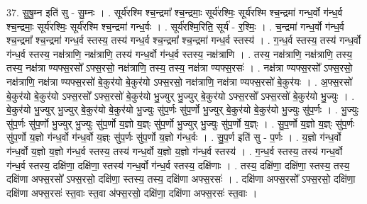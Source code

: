 \documentclass[17pt]{extarticle}
\begin{document}
37. सु॒षु॒म्न इति॑ सु - सु॒म्नः । . सूर्य॑रश्मि श्च॒न्द्रमा᳚ श्च॒न्द्रमाः॒ सूर्य॑रश्मिः॒ सूर्य॑रश्मि श्च॒न्द्रमा॑ गन्ध॒र्वो ग॑न्ध॒र्व श्च॒न्द्रमाः॒ सूर्य॑रश्मिः॒ सूर्य॑रश्मि श्च॒न्द्रमा॑ गन्ध॒र्वः । . सूर्य॑रश्मि॒रिति॒ सूर्य॑ - र॒श्मिः॒ । . च॒न्द्रमा॑ गन्ध॒र्वो ग॑न्ध॒र्व श्च॒न्द्रमा᳚ श्च॒न्द्रमा॑ गन्ध॒र्व स्तस्य॒ तस्य॑ गन्ध॒र्व श्च॒न्द्रमा᳚ श्च॒न्द्रमा॑ गन्ध॒र्व स्तस्य॑ । . ग॒न्ध॒र्व स्तस्य॒ तस्य॑ गन्ध॒र्वो ग॑न्ध॒र्व स्तस्य॒ नक्ष॑त्राणि॒ नक्ष॑त्राणि॒ तस्य॑ गन्ध॒र्वो ग॑न्ध॒र्व स्तस्य॒ नक्ष॑त्राणि । . तस्य॒ नक्ष॑त्राणि॒ नक्ष॑त्राणि॒ तस्य॒ तस्य॒ नक्ष॑त्रा ण्यफ्स॒रसो᳚ ऽफ्स॒रसो॒ नक्ष॑त्राणि॒ तस्य॒ तस्य॒ नक्ष॑त्रा ण्यफ्स॒रसः॑ । . नक्ष॑त्रा ण्यफ्स॒रसो᳚ ऽफ्स॒रसो॒ नक्ष॑त्राणि॒ नक्ष॑त्रा ण्यफ्स॒रसो॑ बे॒कुर॑यो बे॒कुर॑यो ऽफ्स॒रसो॒ नक्ष॑त्राणि॒ नक्ष॑त्रा ण्यफ्स॒रसो॑ बे॒कुर॑यः । . अ॒फ्स॒रसो॑ बे॒कुर॑यो बे॒कुर॑यो ऽफ्स॒रसो᳚ ऽफ्स॒रसो॑ बे॒कुर॑यो भु॒ज्युर् भु॒ज्युर् बे॒कुर॑यो ऽफ्स॒रसो᳚ ऽफ्स॒रसो॑ बे॒कुर॑यो भु॒ज्युः । . बे॒कुर॑यो भु॒ज्युर् भु॒ज्युर् बे॒कुर॑यो बे॒कुर॑यो भु॒ज्युः सु॑प॒र्णः सु॑प॒र्णो भु॒ज्युर् बे॒कुर॑यो बे॒कुर॑यो भु॒ज्युः सु॑प॒र्णः । . भु॒ज्युः सु॑प॒र्णः सु॑प॒र्णो भु॒ज्युर् भु॒ज्युः सु॑प॒र्णो य॒ज्ञो य॒ज्ञ्ः सु॑प॒र्णो भु॒ज्युर् भु॒ज्युः सु॑प॒र्णो य॒ज्ञ्ः । . सु॒प॒र्णो य॒ज्ञो य॒ज्ञ्ः सु॑प॒र्णः सु॑प॒र्णो य॒ज्ञो ग॑न्ध॒र्वो ग॑न्ध॒र्वो य॒ज्ञ्ः सु॑प॒र्णः सु॑प॒र्णो य॒ज्ञो ग॑न्ध॒र्वः । . सु॒प॒र्ण इति॑ सु - प॒र्णः । . य॒ज्ञो ग॑न्ध॒र्वो ग॑न्ध॒र्वो य॒ज्ञो य॒ज्ञो ग॑न्ध॒र्व स्तस्य॒ तस्य॑ गन्ध॒र्वो य॒ज्ञो य॒ज्ञो ग॑न्ध॒र्व स्तस्य॑ । . ग॒न्ध॒र्व स्तस्य॒ तस्य॑ गन्ध॒र्वो ग॑न्ध॒र्व स्तस्य॒ दक्षि॑णा॒ दक्षि॑णा॒ स्तस्य॑ गन्ध॒र्वो ग॑न्ध॒र्व स्तस्य॒ दक्षि॑णाः । . तस्य॒ दक्षि॑णा॒ दक्षि॑णा॒ स्तस्य॒ तस्य॒ दक्षि॑णा अफ्स॒रसो᳚ ऽफ्स॒रसो॒ दक्षि॑णा॒ स्तस्य॒ तस्य॒ दक्षि॑णा अफ्स॒रसः॑ । . दक्षि॑णा अफ्स॒रसो᳚ ऽफ्स॒रसो॒ दक्षि॑णा॒ दक्षि॑णा अफ्स॒रसः॑ स्त॒वाः स्त॒वा अ॑फ्स॒रसो॒ दक्षि॑णा॒ दक्षि॑णा अफ्स॒रसः॑ स्त॒वाः । \newline
\end{document}
